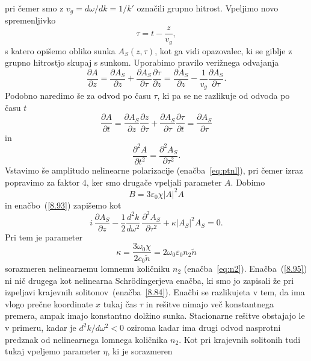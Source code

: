 pri čemer smo z $v_g = d\omega/dk = 1/k'$ označili grupno hitrost.
Vpeljimo novo spremenljivko 
\begin{equation}
\tau=t-\frac{z}{v_{g}},
\label{nelinver}
\end{equation}
s katero opišemo obliko sunka $A_S(z,\tau)$, kot ga vidi opazovalec, ki se giblje
z grupno hitrostjo skupaj s sunkom. Uporabimo pravilo verižnega odvajanja 
\begin{equation}
\frac{\partial A}{\partial z} = \frac{\partial A_S}{\partial z} + \frac{\partial A_S}{\partial \tau}
\frac{\partial \tau}{\partial z}
= \frac{\partial A_S}{\partial z} -\frac{1}{v_g} \frac{\partial A_S}{\partial \tau}.
\end{equation}
Podobno naredimo še za odvod po času $\tau$, ki pa se ne razlikuje od odvoda po času $t$
\begin{equation}
\frac{\partial A}{\partial t} = \frac{\partial A_S}{\partial z}\frac{\partial z}{\partial \tau}+
\frac{\partial A_S}{\partial \tau}\frac{\partial \tau}{\partial t} 
= \frac{\partial A_S}{\partial \tau} 
\end{equation}
in
\begin{equation}
\frac{\partial^2 A}{\partial t^2} = \frac{\partial^2 A_S}{\partial\tau^2}.
\end{equation}
Vstavimo še amplitudo nelinearne polarizacije (enačba~\ref{eq:ptnl}), pri čemer izraz popravimo
za faktor $4$, ker smo drugače vpeljali parameter $A$. Dobimo
\begin{equation}
B = 3\varepsilon_0\chi |A|^2 A
\end{equation}
in enačbo~(\ref{8.93}) zapišemo kot 
\begin{equation}
i\,\frac{\partial A_S}{\partial z}-\frac{1}{2}\frac{d^{2}k}{d\omega^{2}}\,\frac{\partial^{2}A_S}{\partial\tau^{2}}+\kappa\left|A_S\right|^{2}A_S=0.
\label{8.95}
\end{equation}
Pri tem je parameter
\begin{equation}
\kappa = \frac{3\omega_0\chi}{2c_0 \tilde{n}} = 2 \omega_0 \varepsilon_0 n_2 \tilde{n}
\end{equation}
sorazmeren nelinearnemu lomnemu količniku $n_2$ 
(enačba~\ref{eq:n2}). Enačba~(\ref{8.95}) ni nič drugega kot nelinearna Schr\"odingerjeva 
enačba, ki smo jo 
zapisali že pri izpeljavi krajevnih solitonov~(enačba~\ref{8.84}). Enačbi se razlikujeta v tem, da
ima vlogo prečne koordinate $x$ tukaj čas $\tau$ in rešitve nimajo več konstantnega premera,
ampak imajo konstantno dolžino sunka. Stacionarne rešitve obstajajo le v primeru, kadar je  $d^{2}k/d\omega^{2}<0$ oziroma kadar ima drugi odvod nasprotni predznak od nelinearnega lomnega količnika $n_2$. Kot pri krajevnih solitonih tudi tukaj vpeljemo parameter $\eta$, ki je sorazmeren 
